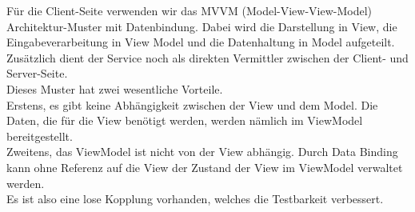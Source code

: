 Für die Client-Seite verwenden wir das MVVM (Model-View-View-Model) Architektur-Muster mit Datenbindung. 
Dabei wird die Darstellung in View, die Eingabeverarbeitung in View Model und die Datenhaltung in Model aufgeteilt. Zusätzlich dient der Service noch als direkten Vermittler zwischen der Client- und Server-Seite. \\
Dieses Muster hat zwei wesentliche Vorteile.\\
Erstens, es gibt keine Abhängigkeit zwischen der View und dem Model. Die Daten, die für die View benötigt werden, werden nämlich im ViewModel bereitgestellt. \\
Zweitens, das ViewModel ist nicht von der View abhängig. Durch Data Binding kann ohne Referenz auf die View der Zustand der View im ViewModel verwaltet werden. \\
Es ist also eine lose Kopplung vorhanden, welches die Testbarkeit verbessert.

